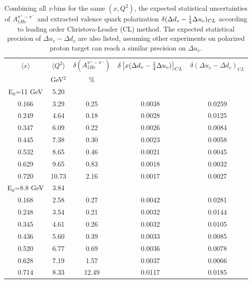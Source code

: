 \begin{table}[htbp]
\begin{center}
\begin{tabular}{|cc||c|c|c|}
\hline
$\langle x \rangle $   & $ \langle Q^2 \rangle $   & $\delta \left(A_{1He}^{\pi^+ - \pi^-} \right)$  &
$\delta \left[ x ( \Delta d_v -{1 \over 4} \Delta u_v ) \right]_{CL}$  & $\delta (\Delta u_v -\Delta d_v)_{CL}$ \\
                       & GeV$^2$              &  $\%$    &       &                                                       \\ \hline \hline
 E$_0$=11 GeV           &    5.20          &          &    &                                                                   \\ 
   0.166 &    3.29 &   0.25 &    0.0038 &    0.0259 \\
   0.249 &    4.64 &   0.18 &    0.0028 &    0.0125 \\
   0.347 &    6.09 &   0.22 &    0.0026 &    0.0084 \\
   0.445 &    7.38 &   0.30 &    0.0023 &    0.0058 \\
   0.532 &    8.65 &   0.46 &    0.0021 &    0.0045 \\
   0.629 &    9.65 &   0.83 &    0.0018 &    0.0032 \\
   0.720 &   10.73 &   2.16 &    0.0017 &    0.0027 \\ 
 E$_0$=8.8 GeV                      &       3.84       &          &    &                                                                 \\ 
   0.168 &    2.58 &   0.27 &    0.0042 &    0.0281 \\
   0.248 &    3.54 &   0.21 &    0.0032 &    0.0144 \\
   0.345 &    4.61 &   0.26 &    0.0032 &    0.0105 \\
   0.436 &    5.60 &   0.39 &    0.0033 &    0.0085 \\
   0.520 &    6.77 &   0.69 &    0.0036 &    0.0078 \\
   0.628 &    7.19 &   1.57 &    0.0037 &    0.0066 \\
   0.714 &    8.33 &  12.49 &    0.0117 &    0.0185 \\
\hline
\end{tabular}
\end{center}
\caption{\label{tab:ddvallz}  
Combining all $z$-bins for the same $(x,Q^2)$, the expected statistical uncertainties of   $A_{1He}^{\pi^+ - \pi^-}$ and  extracted valence quark polarization $\delta ( \Delta d_v -{1 \over 4} \Delta u_v )_{CL}$ according to leading order Christova-Leader (CL) method.  The expected statistical precision of $\Delta u_v -\Delta d_v$  are also listed, assuming other experiments  on polarized proton target can reach a similar  precision on $\Delta u_v$. 
}
\end{table}
